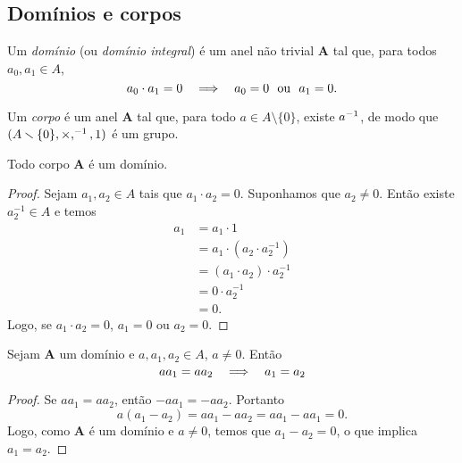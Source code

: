 \subsection{Domínios e corpos}



\begin{definition}
Um \emph{domínio} (ou \emph{domínio integral}) é um anel não trivial $\bm A$ tal que, para todos $a_0,a_1 \in A$,
	\begin{equation*}
	a_0 \cdot a_1 = 0 \entao a_0=0 \text{\ \ ou\ \ } a_1=0.
	\end{equation*}
\end{definition}

\begin{definition}
Um \emph{corpo} é um anel $\bm A$ tal que, para todo $a \in A \setminus \{0\}$, existe $a^{-1}$, de modo que $(A \smallsetminus \{0\},\times,^{-1},1)$ é um grupo.
\end{definition}

\begin{proposition}
\label{prop:corp.dom}
Todo corpo $\bm A$ é um domínio.
\end{proposition}
\begin{proof}
	Sejam $a_1,a_2 \in A$ tais que $a_1 \cdot a_2=0$. Suponhamos que $a_2 \neq 0$. Então existe $a_2^{-1} \in A$ e temos
	\begin{equation*}
	\begin{split}
	a_1 &= a_1 \cdot 1 \\
		&= a_1 \cdot (a_2 \cdot a_2^{-1}) \\
		&= (a_1 \cdot a_2) \cdot a_2^{-1}\\
		&= 0 \cdot a_2^{-1} \\
		&= 0.
	\end{split}
	\end{equation*}
	Logo, se $a_1 \cdot a_2=0$, $a_1=0$ ou $a_2=0$.
\end{proof}

\begin{proposition}
Sejam $\bm A$ um domínio e $a,a_1,a_2 \in A$, $a \neq 0$. Então
	\begin{equation*}
	aa_1 = aa_2 \quad \Longrightarrow \quad a_1=a_2
	\end{equation*}
\end{proposition}
\begin{proof}
	Se $aa_1 = aa_2$, então $-aa_1 = -aa_2$. Portanto
	\begin{equation*}
	a(a_1-a_2) = aa_1 -aa_2 = aa_1 -aa_1 = 0.
	\end{equation*}
Logo, como $\bm A$ é um domínio e $a \neq 0$, temos que $a_1-a_2=0$, o que implica $a_1=a_2$.
\end{proof}

